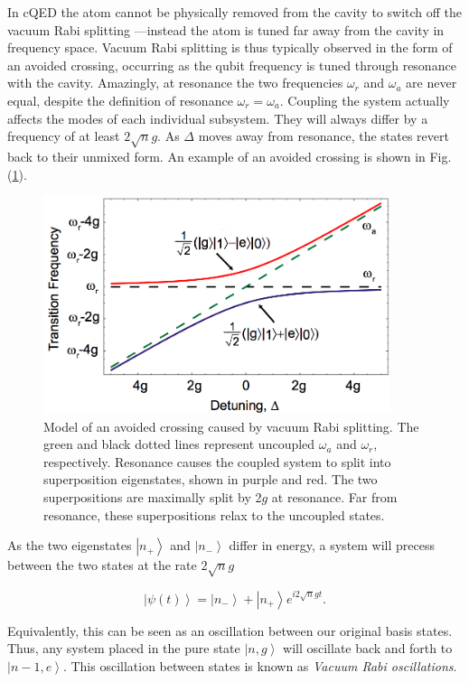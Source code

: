 \documentclass[11 pt, oneside]{book} %
\newcommand{\ket}[1]{\left| #1 \right>} %
\begin{document}
In cQED the atom cannot be physically removed from the cavity to switch off the vacuum Rabi splitting —instead the atom is tuned far away from the cavity in frequency space. Vacuum Rabi splitting is thus typically observed in the form of an avoided crossing, occurring as the qubit frequency is tuned through resonance with the cavity\cite{Bishop}. Amazingly, at resonance the two frequencies $\omega_r$ and $\omega_a$ are never equal, despite the definition of resonance $\omega_r=\omega_a$. Coupling the system actually affects the modes of each individual subsystem. They will always differ by a frequency of at least $2\sqrt{n}g$. As $\Delta$ moves away from resonance, the states revert back to their unmixed form. An example of an avoided crossing is shown in Fig. (\ref{fig:AvoidedCrossing}).

\begin{figure}[h] 
   \centering
   \includegraphics[width=4in]{SchusterAvoidedCrossing.png}%
   \caption[Model of vacuum Rabi splitting]{Model of an avoided crossing caused by vacuum Rabi splitting. The green and black dotted lines represent uncoupled $\omega_a$ and $\omega_r$, respectively. Resonance causes the coupled system to split into superposition eigenstates, shown in purple and red. The two superpositions are maximally split by 2$g$ at resonance. Far from resonance, these superpositions relax to the uncoupled states.}
   \label{fig:AvoidedCrossing}
\end{figure}

As the two eigenstates $\ket{n_+}$ and $\ket{n_-}$ differ in energy, a system will precess between the two states at the rate $2\sqrt{n}g$

\begin{equation}
\ket{\psi(t)}=\ket{n_-}+\ket{n_+}e^{i2\sqrt{n}gt}.
\end{equation}

Equivalently, this can be seen as an oscillation between our original basis states. Thus, any system placed in the pure state $\ket{n,g}$ will oscillate back and forth to $\ket{n-1,e}$. This oscillation between states is known as \emph{Vacuum Rabi oscillations}. 
\end{document}
